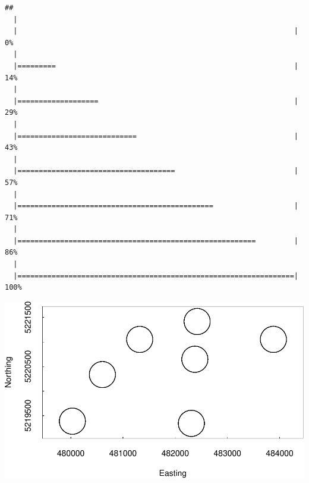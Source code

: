 \documentclass[]{book}
\newenvironment{Shaded}{\begin{snugshade}}{\end{snugshade}}
\newcommand{\CommentTok}[1]{\textcolor[rgb]{0.56,0.35,0.01}{\textit{#1}}}
\newcommand{\DataTypeTok}[1]{\textcolor[rgb]{0.13,0.29,0.53}{#1}}
\newcommand{\FloatTok}[1]{\textcolor[rgb]{0.00,0.00,0.81}{#1}}
\newcommand{\KeywordTok}[1]{\textcolor[rgb]{0.13,0.29,0.53}{\textbf{#1}}}
\newcommand{\NormalTok}[1]{#1}
\newcommand{\OperatorTok}[1]{\textcolor[rgb]{0.81,0.36,0.00}{\textbf{#1}}}
\newcommand{\StringTok}[1]{\textcolor[rgb]{0.31,0.60,0.02}{#1}}
\begin{document}
\begin{verbatim}
## 
  |                                                                       
  |                                                                 |   0%
  |                                                                       
  |=========                                                        |  14%
  |                                                                       
  |===================                                              |  29%
  |                                                                       
  |============================                                     |  43%
  |                                                                       
  |=====================================                            |  57%
  |                                                                       
  |==============================================                   |  71%
  |                                                                       
  |========================================================         |  86%
  |                                                                       
  |=================================================================| 100%
\end{verbatim}

\begin{Shaded}
\end{Shaded}

\includegraphics{_main_files/figure-latex/brd-extr-NL-1.pdf}
\end{document}

